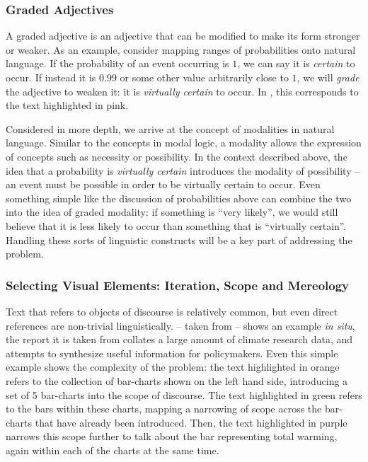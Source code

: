 \subsubsection{Graded Adjectives}
A graded adjective is an adjective that can be modified to make its form stronger or weaker.
As an example, consider mapping ranges of probabilities onto natural language. If the probability
of an event occurring is $1$, we can say it is \emph{certain} to occur. If instead it is $0.99$
or some other value arbitrarily close to $1$, we will \emph{grade} the adjective to weaken it:
it is \emph{virtually certain} to occur. In , this corresponds to the text
highlighted in pink.

Considered in more depth, we arrive at the concept of modalities in natural language. Similar to 
the concepts in modal logic, a modality allows the expression of concepts such as necessity or possibility.
In the context described above, the idea that a probability is \emph{virtually certain} introduces the modality of
possibility -- an event must be possible in order to be virtually certain to occur. Even something simple
like the discussion of probabilities above can combine the two into the idea of graded modality:
if something is ``very likely'', we would still believe that it is less likely to occur than something that
is ``virtually certain''. Handling these sorts of linguistic constructs will be a key part of addressing
the problem. 

\subsubsection{Selecting Visual Elements: Iteration, Scope and Mereology}
Text that refers to objects of discourse is relatively common, but even direct references are non-trivial 
linguistically.  -- taken from \cite{lee23} -- shows an example \textit{in situ},
the report it is taken from collates a large amount of climate research data, and attempts to synthesize
useful information for policymakers. Even this simple example shows the complexity of the problem: the text highlighted
in orange refers to the collection of bar-charts shown on the left hand side, introducing a set of 5 bar-charts
into the scope of discourse. The text highlighted in green refers to the bars within these charts, mapping 
a narrowing of scope across the bar-charts that have already been introduced. Then, the text highlighted in
purple narrows this scope further to talk about the bar representing total warming, again within each of the
charts at the same time. 

